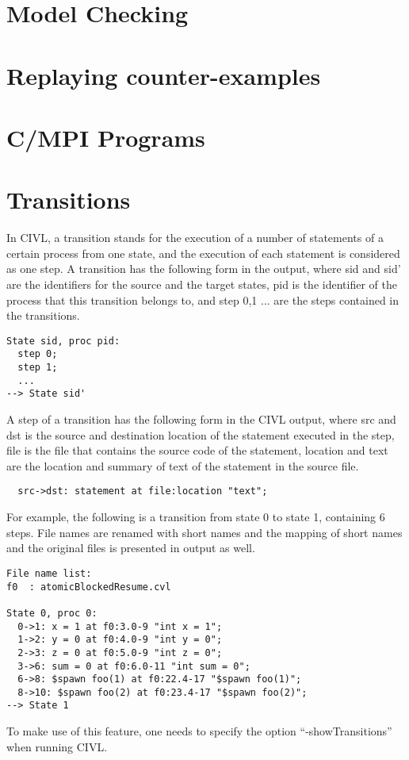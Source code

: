 \chapter{Model Checking}

\chapter{Replaying counter-examples}

\chapter{C/MPI Programs}


\chapter{Transitions}
In CIVL, a transition stands for the execution of a number of statements of a certain process from one state, and the execution of each statement is considered as one step. A transition has the following form in the output, where sid and sid' are the identifiers for the source and the target states, pid is the identifier of the process that this transition belongs to, and step 0,1 ... are the steps contained in the transitions.

\begin{verbatim}
State sid, proc pid: 
  step 0;
  step 1;
  ...
--> State sid'
\end{verbatim}

A step of a transition has the following form in the CIVL output, where src and dst is the source and destination location of the statement executed in the step, file is the file that contains the source code of the statement, location and text are the location and summary of text of the statement in the source file.

\begin{verbatim}
  src->dst: statement at file:location "text";
\end{verbatim}

For example, the following is a transition from state 0 to state 1, containing 6 steps. File names are renamed with short names and the mapping of short names and the original files is presented in output as well.

\begin{verbatim}
File name list:
f0	: atomicBlockedResume.cvl

State 0, proc 0: 
  0->1: x = 1 at f0:3.0-9 "int x = 1";
  1->2: y = 0 at f0:4.0-9 "int y = 0";
  2->3: z = 0 at f0:5.0-9 "int z = 0";
  3->6: sum = 0 at f0:6.0-11 "int sum = 0";
  6->8: $spawn foo(1) at f0:22.4-17 "$spawn foo(1)";
  8->10: $spawn foo(2) at f0:23.4-17 "$spawn foo(2)";
--> State 1
\end{verbatim}

To make use of this feature, one needs to specify the option ``-showTransitions'' when running CIVL.

